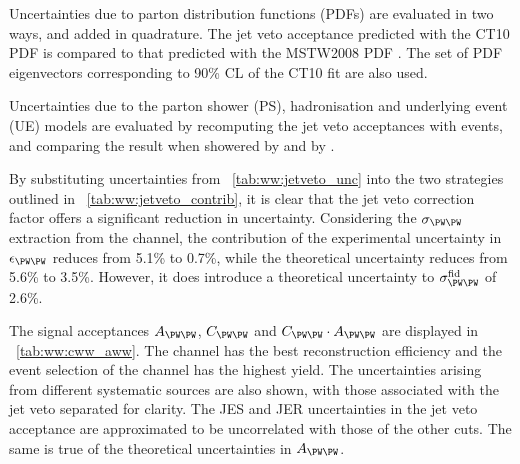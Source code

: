 Uncertainties due to parton distribution functions (PDFs) are evaluated in two ways, and 
added in quadrature. The jet veto acceptance predicted with the CT10 PDF is compared to that 
predicted with the MSTW2008 PDF \cite{MSTW}. The set of PDF eigenvectors corresponding 
to 90\% CL of the CT10 fit are also used.

Uncertainties due to the parton shower (PS), hadronisation and underlying event (UE) 
models are evaluated by recomputing the jet veto acceptances with \powhegbox events, and 
comparing the result when showered by \fherwig and by .

By substituting uncertainties from \Table~\ref{tab:ww:jetveto_unc} into the two 
strategies outlined in \Table~\ref{tab:ww:jetveto_contrib}, it is clear that the jet veto 
correction factor offers a significant reduction in uncertainty. Considering the 
$\sigma_{\WW}$ extraction from the \emch channel, the contribution of the experimental 
uncertainty in $\epsilon_{\WW}$ reduces from 5.1\% to 0.7\%, while the theoretical 
uncertainty reduces from 5.6\% to 3.5\%. However, it does introduce a theoretical 
uncertainty to $\sigma^{\text{fid}}_{\WW}$ of 2.6\%.

The signal acceptances $A_{\WW}$, $C_{\WW}$ and $C_{\WW} \cdot A_{\WW}$ are displayed in 
\Table~\ref{tab:ww:cww_aww}. The \mmch channel has the best reconstruction efficiency and 
the event selection of the \emch channel has the highest yield. The uncertainties arising 
from different systematic sources are also shown, with those associated with the jet veto 
separated for clarity. The JES and JER uncertainties in the jet veto acceptance 
are approximated to be uncorrelated with those of the other cuts. The same is true of the 
theoretical uncertainties in $A_{\WW}$. 

